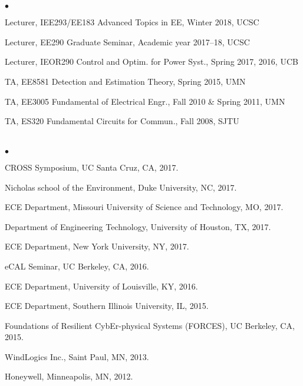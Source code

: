 \documentclass[margin,line]{res}
\newenvironment{list2}{
  \begin{list}{$\bullet$}{%
      \setlength{\itemsep}{0in}
      \setlength{\parsep}{0in} \setlength{\parskip}{0in}
      \setlength{\topsep}{0in} \setlength{\partopsep}{0in}
      \setlength{\leftmargin}{0.10in}}}{\end{list}}
\begin{document}
\begin{resume}
\vspace{.3cm}


\section{}

\begin{list2}
\item Lecturer, IEE293/EE183 Advanced Topics in EE, Winter 2018, UCSC
\item Lecturer, EE290 Graduate Seminar, Academic year 2017--18, UCSC
\item Lecturer, IEOR290 Control and Optim. for Power Syst., Spring 2017, 2016, UCB
\item TA, EE8581 Detection and Estimation Theory, Spring 2015, UMN
\item TA, EE3005 Fundamental of Electrical Engr., Fall 2010 \& Spring 2011, UMN
\item TA, ES320 Fundamental Circuits for Commun., Fall 2008, SJTU
\end{list2}

\vspace{.3cm}


\section{}

\vspace{.2cm}

\begin{list2}

\item   CROSS Symposium, UC Santa Cruz, CA, 2017. 
\item   Nicholas school of the Environment, Duke University, NC, 2017.
\item   ECE Department, Missouri University of Science and Technology, MO, 2017.
\item   Department of Engineering Technology, University of Houston, TX, 2017.
\item   ECE Department, New York University, NY, 2017.   
\item   eCAL Seminar, UC Berkeley, CA, 2016.
\item   ECE Department, University of Louisville, KY, 2016.            
\item   ECE Department, Southern Illinois University, IL, 2015.
\item   Foundations of Resilient CybEr-physical Systems (FORCES), UC Berkeley, CA, 2015.
\item   WindLogics Inc., Saint Paul, MN, 2013.
\item   Honeywell, Minneapolis, MN, 2012.
\end{list2}


\end{resume}
\end{document}
